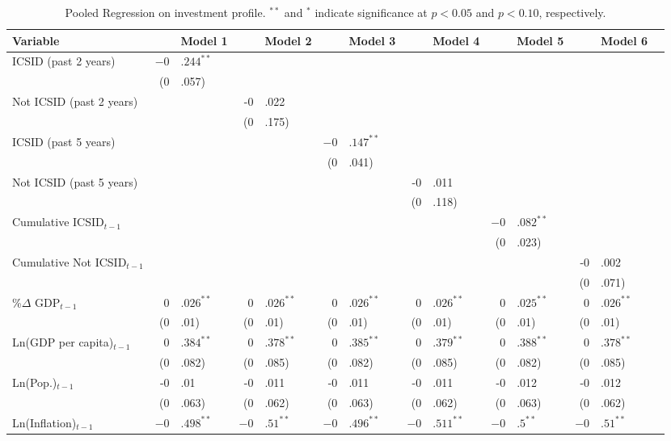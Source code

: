 \begin{enumerate}
\begin{itemize}
			\begin{table}[ht]
			\centering
			\caption{Pooled Regression on investment profile. $^{**}$ and $^{*}$ indicate significance at $p< 0.05 $ and $p< 0.10 $, respectively.} 
			\begingroup\footnotesize
			\begin{tabular}{lr@{} lr@{}lr@{}lr@{} lr@{}lr@{}lr@{}}
			Variable && Model 1 && Model 2 && Model 3 && Model 4 && Model 5 && Model 6 \\ 
			  \hline
			\hline
			ICSID (past 2 years) & $-0$&$.244^{\ast\ast}$ &&  &&  &&  &&  &&  \\ 
			   & (0&.057) &&  &&  &&  &&  &&  \\ 
			  Not ICSID (past 2 years) &&  & -0&.022 && &&  &&  &&  \\ 
			   &  && (0&.175) &&  &&  &&  &&  \\ 
			  ICSID (past 5 years) &  &&  && $-0$&$.147^{\ast\ast}$ &&  &&  &&  \\ 
			   &  &&  && (0&.041) &&  &&  &&  \\ 
			  Not ICSID (past 5 years) &  &&  &&  && -0&.011 &&  &&  \\ 
			   &  &&  &&  && (0&.118) &&  &&  \\ 
			  Cumulative ICSID$_{t-1}$ &  &&  &&  &&  && $-0$&$.082^{\ast\ast}$ &&  \\ 
			   &  &&  &&  &&  && (0&.023) &&  \\ 
			  Cumulative Not ICSID$_{t-1}$ &  &&  &&  &&  &&  && -0&.002 \\ 
			   &  &&  &&  &&  &&  && (0&.071) \\ 
			  \%$\Delta$ GDP$_{t-1}$ & $0$&$.026^{\ast\ast}$ & $0$&$.026^{\ast\ast}$ & $0$&$.026^{\ast\ast}$ & $0$&$.026^{\ast\ast}$ & $0$&$.025^{\ast\ast}$ & $0$&$.026^{\ast\ast}$ \\ 
			   & (0&.01) & (0&.01) & (0&.01) & (0&.01) & (0&.01) & (0&.01) \\ 
			  Ln(GDP per capita)$_{t-1}$ & $0$&$.384^{\ast\ast}$ & $0$&$.378^{\ast\ast}$ & $0$&$.385^{\ast\ast}$ & $0$&$.379^{\ast\ast}$ & $0$&$.388^{\ast\ast}$ & $0$&$.378^{\ast\ast}$ \\ 
			   & (0&.082) & (0&.085) & (0&.082) & (0&.085) & (0&.082) & (0&.085) \\ 
			  Ln(Pop.)$_{t-1}$ & -0&.01 & -0&.011 & -0&.011 & -0&.011 & -0&.012 & -0&.012 \\ 
			   & (0&.063) & (0&.062) & (0&.063) & (0&.062) & (0&.063) & (0&.062) \\ 
			  Ln(Inflation)$_{t-1}$ & $-0$&$.498^{\ast\ast}$ & $-0$&$.51^{\ast\ast}$ & $-0$&$.496^{\ast\ast}$ & $-0$&$.511^{\ast\ast}$ & $-0$&$.5^{\ast\ast}$ & $-0$&$.51^{\ast\ast}$ \\ 

\end{tabular}
\end{table}
\end{itemize}
\end{enumerate}
